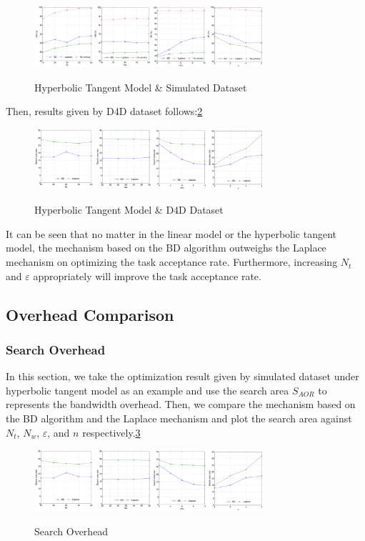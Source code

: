 \begin{figure}
\includegraphics[width=8.5cm]{TanhSim}
\label{img:TanhSim}
\caption{Hyperbolic Tangent Model \& Simulated Dataset}
\end{figure}

Then, results given by D4D dataset follows:\ref{img:TanhD4D}

\begin{figure}
\includegraphics[width=8.5cm]{TanhD4D}
\label{img:TanhD4D}
\caption{Hyperbolic Tangent Model \& D4D Dataset}
\end{figure}

It can be seen that no matter in the linear model or the hyperbolic tangent model, the mechanism based on the BD algorithm outweighs the Laplace mechanism on optimizing the task acceptance rate. Furthermore, increasing $N_t$ and $\varepsilon$ appropriately will improve the task acceptance rate.

\subsection{Overhead Comparison}
\subsubsection{Search Overhead}
In this section, we take the optimization result given by simulated dataset under hyperbolic tangent model as an example and use the search area $S_{AOR}$ to represents the bandwidth overhead. Then, we compare the mechanism based on the BD algorithm and the Laplace mechanism and plot the search area against $N_t$, $N_w$, $\varepsilon$, and $n$ respectively.\ref{img:SAOR}

\begin{figure}
\includegraphics[width=8.5cm]{SAOR}
\label{img:SAOR}
\caption{Search Overhead}
\end{figure}

